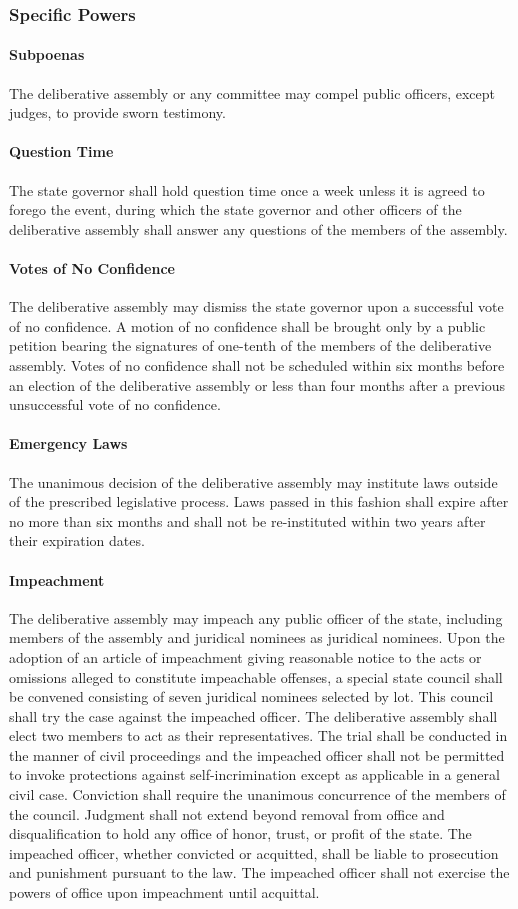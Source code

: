 \documentclass{article}
\begin{document}
\subsubsection{Specific Powers}
\paragraph{Subpoenas}
The deliberative assembly or any committee may compel public officers, except judges, to provide sworn testimony.
\paragraph{Question Time}
The state governor shall hold question time once a week unless it is agreed to forego the event, during which the state governor and other officers of the deliberative assembly shall answer any questions of the members of the assembly.
\paragraph{Votes of No Confidence}
The deliberative assembly may dismiss the state governor upon a successful vote of no confidence. A motion of no confidence shall be brought only by a public petition bearing the signatures of one-tenth of the members of the deliberative assembly. Votes of no confidence shall not be scheduled within six months before an election of the deliberative assembly or less than four months after a previous unsuccessful vote of no confidence.
\paragraph{Emergency Laws}
The unanimous decision of the deliberative assembly may institute laws outside of the prescribed legislative process. Laws passed in this fashion shall expire after no more than six months and shall not be re-instituted within two years after their expiration dates.
\paragraph{Impeachment}
The deliberative assembly may impeach any public officer of the state, including members of the assembly and juridical nominees as juridical nominees. Upon the adoption of an article of impeachment giving reasonable notice to the acts or omissions alleged to constitute impeachable offenses, a special state council shall be convened consisting of seven juridical nominees selected by lot. This council shall try the case against the impeached officer. The deliberative assembly shall elect two members to act as their representatives. The trial shall be conducted in the manner of civil proceedings and the impeached officer shall not be permitted to invoke protections against self-incrimination except as applicable in a general civil case. Conviction shall require the unanimous concurrence of the members of the council. Judgment shall not extend beyond removal from office and disqualification to hold any office of honor, trust, or profit of the state. The impeached officer, whether convicted or acquitted, shall be liable to prosecution and punishment pursuant to the law. The impeached officer shall not exercise the powers of office upon impeachment until acquittal.
\end{document}
